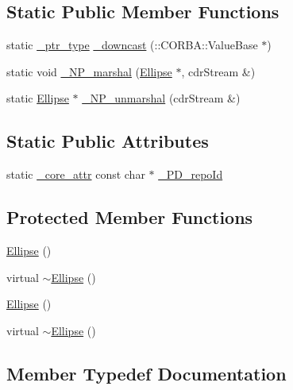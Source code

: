 \subsection*{Static Public Member Functions}
\begin{DoxyCompactItemize}
\item 
static \hyperlink{class_draw_a5164256572b3c4123ceecd1897c248dd}{\+\_\+ptr\+\_\+type} \hyperlink{class_ellipse_acbcf7089f6cceeee9bb7663221f94cfa}{\+\_\+downcast} (\+::C\+O\+R\+B\+A\+::\+Value\+Base $\ast$)
\item 
static void \hyperlink{class_ellipse_a7b86d2bf246fb67efe6b43220c7509d9}{\+\_\+\+N\+P\+\_\+marshal} (\hyperlink{class_ellipse}{Ellipse} $\ast$, cdr\+Stream \&)
\item 
static \hyperlink{class_ellipse}{Ellipse} $\ast$ \hyperlink{class_ellipse_a1c519c9754fc33d80898ed92b470770a}{\+\_\+\+N\+P\+\_\+unmarshal} (cdr\+Stream \&)
\end{DoxyCompactItemize}
\subsection*{Static Public Attributes}
\begin{DoxyCompactItemize}
\item 
static \hyperlink{_petit_prince_8hpp_a5f7bf7cddb608c2aad7c95f55f8a33c5}{\+\_\+core\+\_\+attr} const char $\ast$ \hyperlink{class_ellipse_a9d889330622bef63cd90c0f42e7ee344}{\+\_\+\+P\+D\+\_\+repo\+Id}
\end{DoxyCompactItemize}
\subsection*{Protected Member Functions}
\begin{DoxyCompactItemize}
\item 
\hyperlink{class_ellipse_aaff4917eddd8882616fe2f956151ba9b}{Ellipse} ()
\item 
virtual \hyperlink{class_ellipse_a5ab8160e6bf40ced81490d6d83d33d89}{$\sim$\+Ellipse} ()
\item 
\hyperlink{class_ellipse_aaff4917eddd8882616fe2f956151ba9b}{Ellipse} ()
\item 
virtual \hyperlink{class_ellipse_a5ab8160e6bf40ced81490d6d83d33d89}{$\sim$\+Ellipse} ()
\end{DoxyCompactItemize}


\subsection{Member Typedef Documentation}

